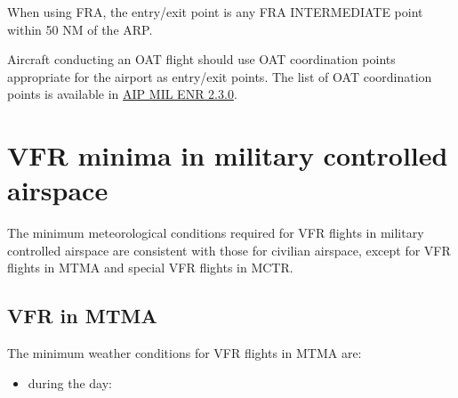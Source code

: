 When using FRA, the entry/exit point is any FRA INTERMEDIATE point within 50 NM of the ARP.\@

Aircraft conducting an OAT flight should use OAT coordination points appropriate for the airport as entry/exit points. The list of OAT coordination points is available in \href{https://www.ais.pansa.pl/mil/pliki/EP_ENR_2_3_0-1_en.pdf}{AIP MIL ENR 2.3.0}.

\chapter{VFR minima in military controlled airspace}
The minimum meteorological conditions required for VFR flights in military controlled airspace are consistent with those for civilian airspace, except for VFR flights in MTMA and special VFR flights in MCTR.

\section{VFR in MTMA}
The minimum weather conditions for VFR flights in MTMA are:
\begin{itemize}
	\item during the day:

\end{itemize}

